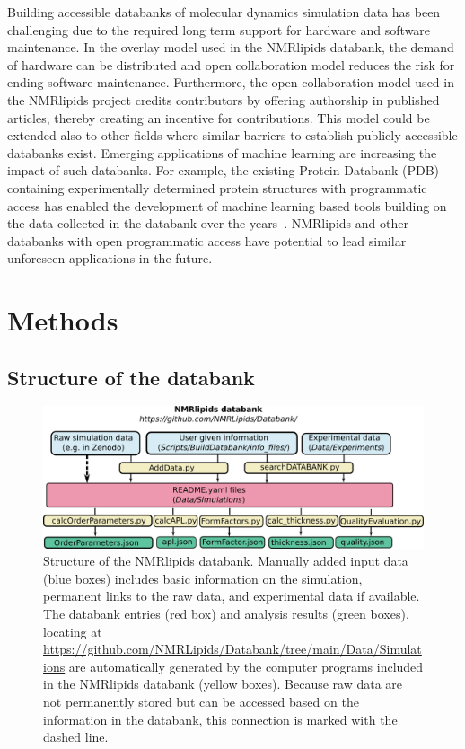 \documentclass[fleqn,10pt]{wlscirep}
\begin{document}
Building accessible databanks of molecular dynamics simulation data has been challenging due to the required long term support for hardware and software maintenance. In the overlay model used in the NMRlipids databank, the demand of hardware can be distributed and open collaboration model reduces the risk for ending software maintenance. Furthermore, the open collaboration model used in the NMRlipids project credits contributors by offering authorship in published articles, thereby creating an incentive for contributions. This model could be extended also to other fields where similar barriers to establish publicly accessible databanks exist. Emerging applications of machine learning are increasing the impact of such databanks. For example, the existing Protein Databank (PDB)~\cite{??} containing experimentally determined protein structures with programmatic access has enabled the development of machine learning based tools building on the data collected in the databank over the years~\cite{??}. NMRlipids and other databanks with open programmatic access have potential to lead similar unforeseen applications in the future.


\section{Methods}


\subsection{Structure of the databank}

\begin{figure}
  \includegraphics[width=\textwidth]{Figures/DataBankChart.pdf}
  \caption{Structure of the NMRlipids databank. Manually added input data (blue boxes) includes basic information on the simulation, permanent links to the raw data, and experimental data if available. The databank entries (red box) and analysis results (green boxes), locating at \url{https://github.com/NMRLipids/Databank/tree/main/Data/Simulations} are automatically generated by the computer programs included in the NMRlipids databank (yellow boxes). Because raw data are not permanently stored but can be accessed based on the information in the databank, this connection is marked with the dashed line. }\label{DatabankStructure}
\end{figure}
\end{document}
